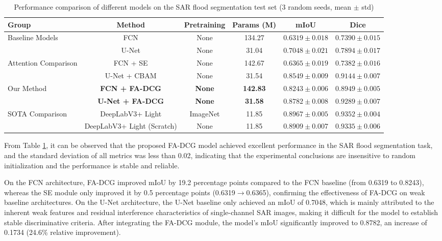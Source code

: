 \documentclass[lettersize,journal]{IEEEtran}
\begin{document}
\begin{table}[htbp]
\centering
\caption{Performance comparison of different models on the SAR flood segmentation test set (3 random seeds, mean $\pm$ std)}
\label{tab:main_results}
\begin{tabular}{lccccc}
\toprule
\textbf{Group} & \textbf{Method} & \textbf{Pretraining} & \textbf{Params (M)} & \textbf{mIoU} & \textbf{Dice} \\
\midrule
\multirow{2}{*}{Baseline Models} 
& FCN & None & 134.27 & $0.6319 \pm 0.018$ & $0.7390 \pm 0.015$ \\
& U-Net & None & 31.04 & $0.7048 \pm 0.021$ & $0.7894 \pm 0.017$ \\
\midrule
\multirow{2}{*}{Attention Comparison} 
& FCN + SE & None & 142.67 & $0.6365 \pm 0.019$ & $0.7382 \pm 0.016$ \\
& U-Net + CBAM & None & 31.54 & $0.8549 \pm 0.009$ & $0.9144 \pm 0.007$ \\
\midrule
\multirow{2}{*}{Our Method} 
& \textbf{FCN + FA-DCG} & \textbf{None} & \textbf{142.83} & $\mathbf{0.8243 \pm 0.006}$ & $\mathbf{0.8949 \pm 0.005}$ \\
& \textbf{U-Net + FA-DCG} & \textbf{None} & \textbf{31.58} & $\mathbf{0.8782 \pm 0.008}$ & $\mathbf{0.9289 \pm 0.007}$ \\
\midrule
\multirow{2}{*}{SOTA Comparison} 
& DeepLabV3+ Light & ImageNet & 11.85 & $0.8967 \pm 0.005$ & $0.9352 \pm 0.004$ \\
& DeepLabV3+ Light (Scratch) & None & 11.85 & $0.8909 \pm 0.007$ & $0.9335 \pm 0.006$ \\
\bottomrule
\end{tabular}
\end{table}

From Table \ref{tab:main_results}, it can be observed that the proposed FA-DCG model achieved excellent performance in the SAR flood segmentation task, and the standard deviation of all metrics was less than 0.02, indicating that the experimental conclusions are insensitive to random initialization and the performance is stable and reliable.

On the FCN architecture, FA-DCG improved mIoU by 19.2 percentage points compared to the FCN baseline (from 0.6319 to 0.8243), whereas the SE module only improved it by 0.5 percentage points (0.6319$\rightarrow$0.6365), confirming the effectiveness of FA-DCG on weak baseline architectures. On the U-Net architecture, the U-Net baseline only achieved an mIoU of 0.7048, which is mainly attributed to the inherent weak features and residual interference characteristics of single-channel SAR images, making it difficult for the model to establish stable discriminative criteria. After integrating the FA-DCG module, the model's mIoU significantly improved to 0.8782, an increase of 0.1734 (24.6\% relative improvement).
\end{document}
